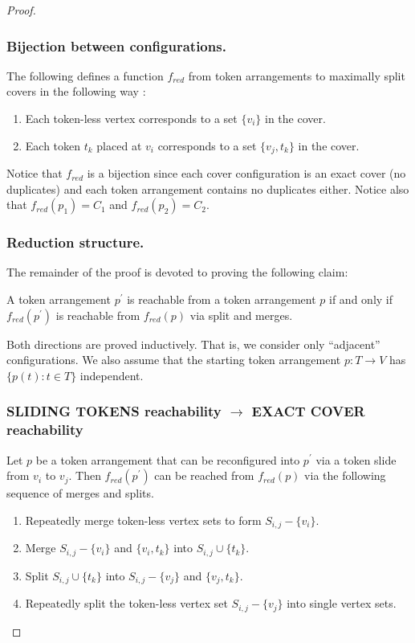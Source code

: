 \begin{proof}
\subsubsection{Bijection between configurations.}
The following defines a function $f_{red}$ from token arrangements to maximally split covers in the following way :
\begin{enumerate}
  \item Each token-less vertex corresponds to a set $\{v_i\}$ in the cover.
  \item Each token $t_k$ placed at $v_i$ corresponds to a set $\{v_j, t_k\}$ in the cover.
\end{enumerate}
Notice that $f_{red}$ is a bijection since each cover configuration is an exact cover (no duplicates) and each token
arrangement contains no duplicates either. Notice also that $f_{red}(p_1) = C_1$ and $f_{red}(p_2) = C_2$.


\subsubsection{Reduction structure.}
The remainder of the proof is devoted to proving the following claim:
\begin{claim} A token arrangement $p^{'}$ is reachable from a token arrangement $p$ if and only if $f_{red}(p^{'})$ is reachable from
$f_{red}(p)$ via split and merges.
\end{claim}
Both directions are proved inductively. That is, we consider only “adjacent” configurations. We also assume that the starting token
arrangement $p : T \rightarrow V$ has $ \{p(t) : t \in T \}$ independent.

\subsubsection{SLIDING TOKENS reachability $\rightarrow$ EXACT COVER reachability}
Let $p$ be a token arrangement that can be reconfigured into $p^{'}$ via a token slide from $v_i$ to $v_j$. Then $f_{red}(p^{'})$ can be reached
from $f_{red}(p)$ via the following sequence of merges and splits.
\begin{enumerate}
  \item Repeatedly merge token-less vertex sets to form $S_{i,j}-\{v_i\}$.
  \item Merge $S_{i,j} - \{v_i\}$ and $\{v_i, t_k\}$ into $S_{i,j} \cup \{t_k\}$.
  \item Split $S_{i,j} \cup \{t_k\}$ into $S_{i,j} - \{v_j\}$ and $\{v_j, t_k\}$.
  \item Repeatedly split the token-less vertex set $S_{i,j}-\{v_j\}$ into single vertex sets.
\end{enumerate}


\end{proof}
